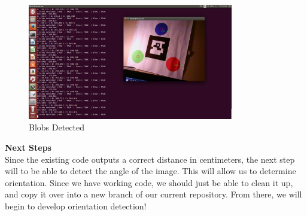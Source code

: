 \documentclass[11pt]{book}
\begin{document}
	\begin{figure}[h]
		\centering
		\includegraphics[width=0.8\textwidth]{coolpic.png}
		\caption{Blobs Detected}
	\end{figure}

\vspace{2mm}
\noindent\large{\textbf{Next Steps}}\\	
\normalsize	
\noindent Since the existing code outputs a correct distance in centimeters, the next step will to be able to detect the angle of the image. This will allow us to determine orientation. Since we have working code, we should just be able to clean it up, and copy it over into a new branch of our current repository. From there, we will begin to develop orientation detection!
\end{document}

